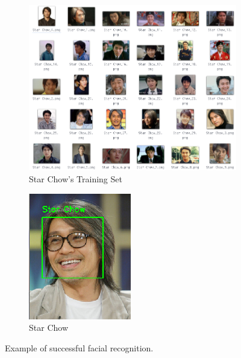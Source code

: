 \begin{figure}[!htb]
  \centering
  \begin{subfigure}[b]{0.65\linewidth}
    \includegraphics[width=\linewidth]{figures/star-chow-training-set.png}
    \caption{Star Chow's Training Set}
  \end{subfigure}
  \hfill
  \begin{subfigure}[b]{0.3\linewidth}
    \includegraphics[width=\linewidth]{figures/star-chow-success.png}
    \caption{Star Chow}
  \end{subfigure}
  \caption{Example of successful facial recognition.}
  \label{fig:correct-recog}
\end{figure}
\vspace{0.5cm}



